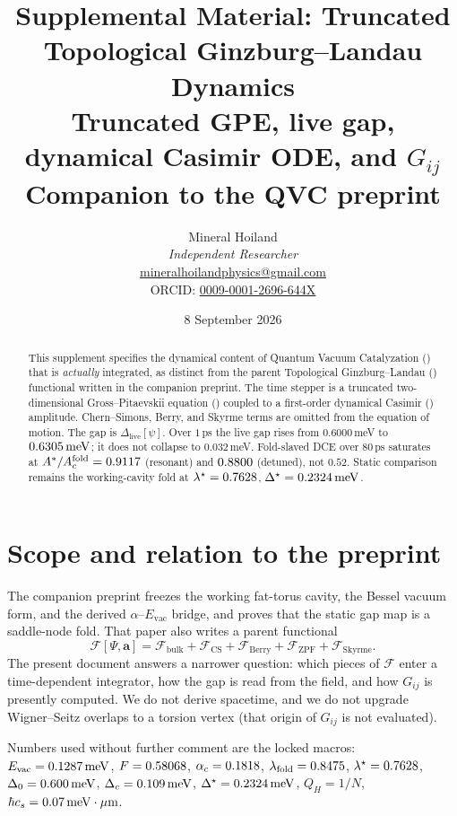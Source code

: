 \documentclass[11pt,letterpaper]{article}
\title{\textbf{Supplemental Material: Truncated Topological Ginzburg--Landau Dynamics}\\
\large Truncated GPE, live gap, dynamical Casimir ODE, and $G_{ij}$\\
\large Companion to the QVC preprint}
\author{Mineral Hoiland\\
\textit{Independent Researcher}\\
\href{mailto:mineralhoilandphysics@gmail.com}{mineralhoilandphysics@gmail.com}\\
ORCID: \href{https://orcid.org/0009-0001-2696-644X}{0009-0001-2696-644X}}
\date{8 September 2026}
\begin{document}
\maketitle

\begin{abstract}
This supplement specifies the dynamical content of Quantum Vacuum Catalyzation (\QVC) that is \emph{actually} integrated, as distinct from the parent Topological Ginzburg--Landau (\TQGL) functional written in the companion preprint. The time stepper is a truncated two-dimensional Gross--Pitaevskii equation (\GPE) coupled to a first-order dynamical Casimir (\DCE) amplitude. Chern--Simons, Berry, and Skyrme terms are omitted from the equation of motion. The gap is $\Delta_{\mathrm{live}}[\psi]$. Over $1$\,ps the live gap rises from $0.6000$\,meV to $0.6305\,\mathrm{meV}$; it does not collapse to $0.032$\,meV. Fold-slaved DCE over $80$\,ps saturates at $A^*/A_c^{\mathrm{fold}}=0.9117$ (resonant) and $0.8800$ (detuned), not $0.52$. Static comparison remains the working-cavity fold at $\lambda^\star=0.7628$, $\Delta^\star=0.2324\,\mathrm{meV}$.
\end{abstract}

\tableofcontents
\newpage

\section{Scope and relation to the preprint}
\label{sec:scope}

The companion preprint freezes the working fat-torus cavity, the Bessel vacuum form, and the derived $\alpha$--$E_{\mathrm{vac}}$ bridge, and proves that the static gap map is a saddle-node fold. That paper also writes a parent functional
\begin{equation}
\mathcal{F}[\Psi,\mathbf{a}]=\mathcal{F}_{\mathrm{bulk}}+\mathcal{F}_{\mathrm{CS}}+\mathcal{F}_{\mathrm{Berry}}+\mathcal{F}_{\mathrm{ZPF}}+\mathcal{F}_{\mathrm{Skyrme}}.
\end{equation}
The present document answers a narrower question: which pieces of $\mathcal{F}$ enter a time-dependent integrator, how the gap is read from the field, and how $G_{ij}$ is presently computed. We do not derive \TDVT{} spacetime, and we do not upgrade Wigner--Seitz overlaps to a torsion vertex (that origin of $G_{ij}$ is not evaluated).

Numbers used without further comment are the locked macros: $E_{\mathrm{vac}}=0.1287\,\mathrm{meV}$, $F=0.58068$, $\alpha_c=0.1818$, $\lambda_{\mathrm{fold}}=0.8475$, $\lambda^\star=0.7628$, $\Delta_0=0.600\,\mathrm{meV}$, $\Delta_c=0.109\,\mathrm{meV}$, $\Delta^\star=0.2324\,\mathrm{meV}$, $Q_H=1/N$, $\hbar c_s=0.07\,\mathrm{meV\cdot\mu m}$.
\end{document}
